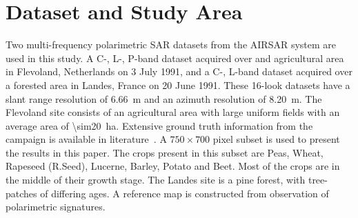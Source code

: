 

\section{Dataset and Study Area}

Two multi-frequency polarimetric SAR datasets from the AIRSAR system are used in this study. A C-, L-, P-band dataset  acquired over and agricultural area in Flevoland, Netherlands on 3 July 1991, and a C-, L-band dataset acquired over a forested area in Landes, France on 20 June 1991.
These 16-look datasets have a slant range resolution of \SI{6.66}{m} and an azimuth resolution of \SI{8.20}{m}. 
The Flevoland site consists of an agricultural area with large uniform fields with an average area of \SI{\sim20}{ha}. Extensive ground truth information from the campaign is available in literature~\cite{vissers1992groundtruth}.  
A $750\times700$ pixel subset is used to present the results in this paper. The crops present in this subset are Peas, Wheat, Rapeseed (R.Seed), Lucerne, Barley, Potato and Beet. Most of the crops are in the middle of their growth stage.  
The Landes site is a pine forest, with tree-patches of differing ages. A reference map is constructed from observation of polarimetric signatures.






